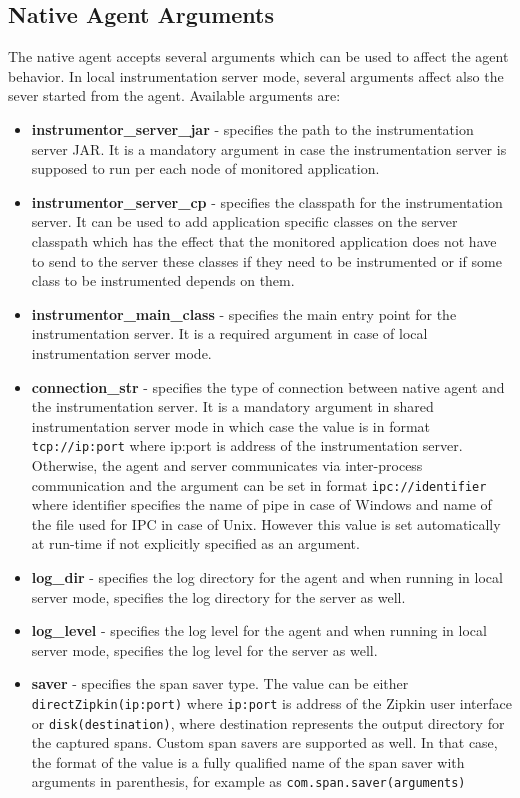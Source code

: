 \subsection{Native Agent Arguments}
The native agent accepts several arguments which can be used to affect the agent behavior. In local instrumentation server mode, several arguments affect also the sever started from the agent. Available arguments are:
\begin{itemize}
	\item \textbf{instrumentor\_server\_jar} - specifies the path to the instrumentation server JAR. It is a mandatory argument in case the instrumentation server is supposed to run per each node of monitored application.
	\item \textbf{instrumentor\_server\_cp} - specifies the classpath for the instrumentation server. It can be used to add application specific classes on the server classpath which has the effect that the monitored application does not have to send to the server these classes if they need to be instrumented or if some class to be instrumented depends on them.
	\item \textbf{instrumentor\_main\_class} - specifies the main entry point for the instrumentation server. It is a required argument in case of local instrumentation server mode.
	\item \textbf{connection\_str} - specifies the type of connection between native agent and the instrumentation server. It is a mandatory argument in shared instrumentation server mode in which case the value is in format \texttt{tcp://ip:port} where ip:port is address of the instrumentation server. Otherwise, the agent and server communicates via inter-process communication and the argument can be set in format \texttt{ipc://identifier} where identifier specifies the name of pipe in case of Windows and name of the file used for IPC in case of Unix. However this value is set automatically at run-time if not explicitly specified as an argument.
	\item \textbf{log\_dir} - specifies the log directory for the agent and when running in local server mode, specifies the log directory for the server as well.
	\item \textbf{log\_level} - specifies the log level for the agent and when running in local server mode, specifies the log level for the server as well.
	\item \textbf{saver} - specifies the span saver type. The value can be either \newline \texttt{directZipkin(ip:port)} where \texttt{ip:port} is address of the Zipkin user interface or \texttt{disk(destination)}, where destination represents the output directory for the captured spans. Custom span savers are supported as well. In that case, the format of the value is a fully qualified name of the span saver with arguments in parenthesis, for example as \texttt{com.span.saver(arguments)}

\end{itemize}
